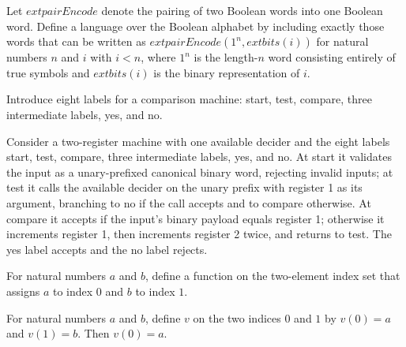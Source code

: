 \begin{definition}
\label{Complexity.ltLang}
\leanok
{}
Let $	ext{pairEncode}$ denote the pairing of two Boolean words into one Boolean word.
Define a language over the Boolean alphabet by including exactly those words that can be
written as $	ext{pairEncode}(1^n,	ext{bits}(i))$ for natural numbers $n$ and $i$ with
$i<n$, where $1^n$ is the length-$n$ word consisting entirely of true symbols and
$	ext{bits}(i)$ is the binary representation of $i$.
\end{definition}

\begin{definition}
\label{Complexity.LtM.Lb}
\leanok
Introduce eight labels for a comparison machine: start, test, compare, three
intermediate labels, yes, and no.
\end{definition}

\begin{definition}
\label{Complexity.LtM.A}
\leanok
{}
Consider a two-register machine with one available decider and the eight labels start,
test, compare, three intermediate labels, yes, and no. At start it validates the input
as a unary-prefixed canonical binary word, rejecting invalid inputs; at test it calls
the available decider on the unary prefix with register 1 as its argument, branching to
no if the call accepts and to compare otherwise. At compare it accepts if the input's
binary payload equals register 1; otherwise it increments register 1, then increments
register 2 twice, and returns to test. The yes label accepts and the no label rejects.
\end{definition}

\begin{definition}
\label{Complexity.LtM.vv}
\leanok
For natural numbers $a$ and $b$, define a function on the two-element index set that
assigns $a$ to index $0$ and $b$ to index $1$.
\end{definition}

\begin{lemma}
\label{Complexity.LtM.vv_0}
\leanok
{}
For natural numbers $a$ and $b$, define $v$ on the two indices $0$ and $1$ by $v(0)=a$
and $v(1)=b$. Then $v(0)=a$.
\end{lemma}

